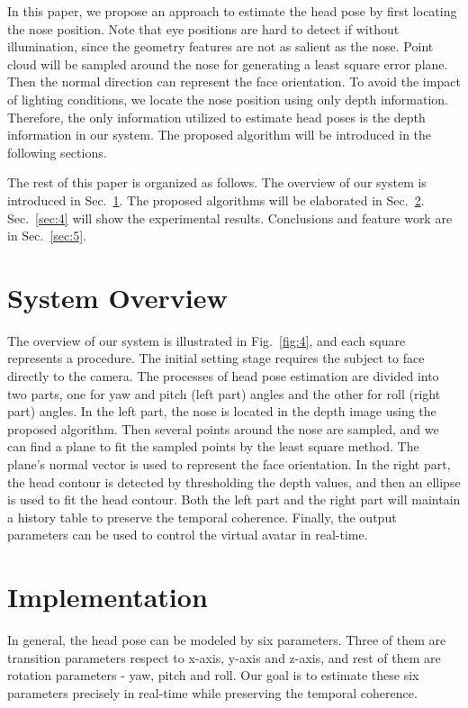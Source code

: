 In this paper, we propose an approach to estimate the head pose by first locating the nose position. Note that eye positions are hard to detect if without illumination, since the geometry features are not as salient as the nose. Point cloud will  be  sampled  around the nose for generating a least square error plane. Then the normal direction can represent the face orientation. To avoid the impact of lighting conditions, we locate the nose position using only depth information.  Therefore, the only information utilized to estimate head poses is the depth information in our system. The proposed algorithm will be introduced in the following sections.

The rest of this paper is organized as follows. The overview of our system is introduced in Sec.~\ref{sec:2}. The proposed algorithms will be elaborated in Sec.~\ref{sec:3}. Sec.~\ref{sec:4} will show the experimental results. Conclusions and feature work are in Sec.~\ref{sec:5}.


\section{System Overview}
\label{sec:2}
The overview of our system is illustrated in Fig.~\ref{fig:4}, and each square represents a procedure. The initial setting stage requires the subject to face directly to the camera. The processes of head pose estimation are divided into two parts, one for yaw and pitch (left part) angles and the other for roll (right part) angles. In the left part, the nose is located in the depth image using the proposed algorithm. Then several points around the nose are sampled, and we can find a plane to fit the sampled points by the least square method. The plane’s normal vector is used to represent the face orientation. In the right part, the head contour is detected by thresholding the depth values, and then an ellipse is used to fit the head contour. Both the left part and the right part will maintain a history table to preserve the temporal coherence. Finally, the output parameters can be used to control the virtual avatar in real-time.


\section{Implementation}
\label{sec:3}
In general, the head pose can be modeled by six parameters. Three of them are transition parameters respect to x-axis, y-axis and z-axis, and rest of them are rotation parameters - yaw, pitch and roll. Our goal is to estimate these six parameters precisely in real-time while preserving the temporal coherence.

